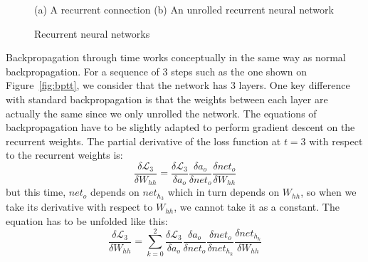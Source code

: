 \begin{figure}
	\centering

	{\small (a) A recurrent connection}
	\qquad
	{\small (b) An unrolled recurrent neural network}
	\caption{Recurrent neural networks}
	\label{fig:rnn}
\end{figure}


Backpropagation through time \cite{bptt} works conceptually in the same way
as normal backpropagation. For a sequence of 3 steps such as the one shown
on Figure~\ref{fig:bptt}, we consider that the network has 3 layers. 
One key difference with standard backpropagation is that the weights
between each layer are actually the same since we only unrolled the network.
The equations of backpropagation have to be slightly adapted to perform
gradient descent on the recurrent weights. The partial derivative of the
loss function at $t=3$ with respect to the recurrent weights is:
\begin{equation}
	\frac{\delta\mathcal{L}_3}{\delta W_{hh}} = 
\frac{\delta\mathcal{L}_3}{\delta a_o}
\frac{\delta a_o}{\delta net_o}
\frac{\delta net_o}{\delta W_{hh}}
	\label{eq:chainrule_bptt}
\end{equation}
but this time, $net_o$ depends on $net_{h_3}$ which in turn depends on $W_{hh}$, so
when we take its derivative with respect to $W_{hh}$, we cannot take it as
a constant. The equation has to be unfolded like this:
\begin{equation}
	\frac{\delta\mathcal{L}_3}{\delta W_{hh}} = 
	\sum\limits_{k=0}^2
\frac{\delta\mathcal{L}_3}{\delta a_o}
\frac{\delta a_o}{\delta net_o}
\frac{\delta net_o}{\delta net_{h_k}}
	\frac{\delta net_{h_k}}{\delta W_{hh}}
\end{equation}

